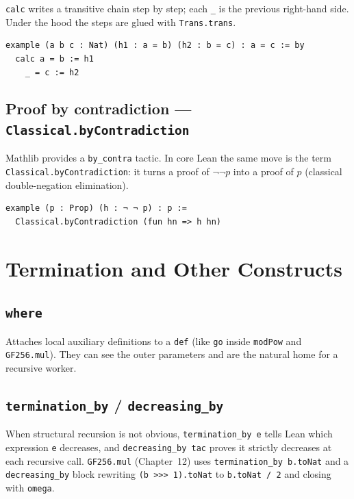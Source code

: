\documentclass[11pt, a4paper, oneside]{book}
\newcommand{\lc}[1]{\texttt{#1}}
\begin{document}
\lc{calc} writes a transitive chain step by step; each \lc{\_} is the previous
right-hand side. Under the hood the steps are glued with \lc{Trans.trans}.

\begin{leanbox}
\begin{verbatim}
example (a b c : Nat) (h1 : a = b) (h2 : b = c) : a = c := by
  calc a = b := h1
    _ = c := h2
\end{verbatim}
\end{leanbox}

\subsection*{Proof by contradiction --- \lc{Classical.byContradiction}}

\begin{sloppypar}
Mathlib provides a \lc{by\_contra} tactic. In core Lean the same move is the
term \lc{Classical.byContradiction}: it turns a proof of $\lnot\lnot p$ into a
proof of $p$ (classical double-negation elimination).
\end{sloppypar}

\begin{leanbox}
\begin{verbatim}
example (p : Prop) (h : ¬ ¬ p) : p :=
  Classical.byContradiction (fun hn => h hn)
\end{verbatim}
\end{leanbox}

\section{Termination and Other Constructs}

\subsection*{\lc{where}}

Attaches local auxiliary definitions to a \lc{def} (like \lc{go} inside
\lc{modPow} and \lc{GF256.mul}). They can see the outer parameters and are the
natural home for a recursive worker.

\subsection*{\lc{termination\_by} / \lc{decreasing\_by}}

When structural recursion is not obvious, \lc{termination\_by e} tells Lean which
expression \lc{e} decreases, and \lc{decreasing\_by tac} proves it strictly
decreases at each recursive call. \lc{GF256.mul} (Chapter~12) uses
\lc{termination\_by b.toNat} and a \lc{decreasing\_by} block rewriting
\lc{(b >>> 1).toNat} to \lc{b.toNat / 2} and closing with \lc{omega}.
\end{document}
